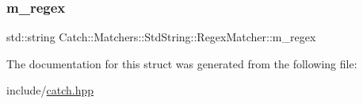 \subsubsection{\texorpdfstring{m\_regex}{m\_regex}}
{\footnotesize\ttfamily std\+::string Catch\+::\+Matchers\+::\+Std\+String\+::\+Regex\+Matcher\+::m\+\_\+regex\hspace{0.3cm}{\ttfamily [private]}}



The documentation for this struct was generated from the following file\+:\begin{DoxyCompactItemize}
\item 
include/\mbox{\hyperlink{catch_8hpp}{catch.\+hpp}}\end{DoxyCompactItemize}
